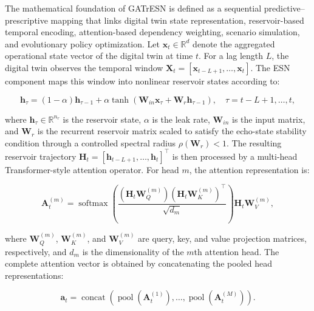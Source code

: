 \documentclass[apajournal,article,submit,pdftex,moreauthors]{Definitions/mdpi}
\begin{document}
The mathematical foundation of GATrESN is defined as a sequential predictive--prescriptive mapping that links digital twin state representation, reservoir-based temporal encoding, attention-based dependency weighting, scenario simulation, and evolutionary policy optimization. Let $\mathbf{x}_t \in \mathbb{R}^{d}$ denote the aggregated operational state vector of the digital twin at time $t$. For a lag length $L$, the digital twin observes the temporal window $\mathbf{X}_t=[\mathbf{x}_{t-L+1},\ldots,\mathbf{x}_{t}]$. The ESN component maps this window into nonlinear reservoir states according to:

\begin{linenomath}
\begin{equation}
\mathbf{h}_{\tau}
=
(1-\alpha)\mathbf{h}_{\tau-1}
+
\alpha \tanh \left(
\mathbf{W}_{in}\mathbf{x}_{\tau}
+
\mathbf{W}_{r}\mathbf{h}_{\tau-1}
\right),
\quad
\tau=t-L+1,\ldots,t,
\label{eq:esn_state}
\end{equation}
\end{linenomath}
where $\mathbf{h}_{\tau}\in \mathbb{R}^{n_r}$ is the reservoir state, $\alpha$ is the leak rate, $\mathbf{W}_{in}$ is the input matrix, and $\mathbf{W}_{r}$ is the recurrent reservoir matrix scaled to satisfy the echo-state stability condition through a controlled spectral radius $\rho(\mathbf{W}_{r})<1$. The resulting reservoir trajectory $\mathbf{H}_t=[\mathbf{h}_{t-L+1},\ldots,\mathbf{h}_{t}]^{\top}$ is then processed by a multi-head Transformer-style attention operator. For head $m$, the attention representation is:

\begin{linenomath}
\begin{equation}
\mathbf{A}_{t}^{(m)}
=
\operatorname{softmax}
\left(
\frac{
(\mathbf{H}_t\mathbf{W}_{Q}^{(m)})
(\mathbf{H}_t\mathbf{W}_{K}^{(m)})^{\top}
}{
\sqrt{d_m}
}
\right)
\mathbf{H}_t\mathbf{W}_{V}^{(m)},
\label{eq:attention_head}
\end{equation}
\end{linenomath}
where $\mathbf{W}_{Q}^{(m)}$, $\mathbf{W}_{K}^{(m)}$, and $\mathbf{W}_{V}^{(m)}$ are query, key, and value projection matrices, respectively, and $d_m$ is the dimensionality of the $m$th attention head. The complete attention vector is obtained by concatenating the pooled head representations:

\begin{linenomath}
\begin{equation}
\mathbf{a}_t
=
\operatorname{concat}
\left(
\operatorname{pool}(\mathbf{A}_{t}^{(1)}),
\ldots,
\operatorname{pool}(\mathbf{A}_{t}^{(M)})
\right).
\label{eq:attention_concat}
\end{equation}
\end{linenomath}
\end{document}
